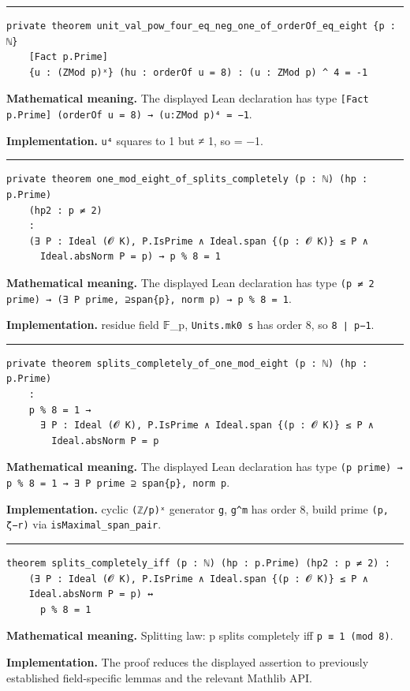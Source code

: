 \documentclass[UTF8,a4paper,11pt,fontset=fandol]{ctexart}
\theoremstyle{definition}
\newcommand{\statementsep}{\par\medskip\hrule\medskip}
\begin{document}
\statementsep
\begin{verbatim}
private theorem unit_val_pow_four_eq_neg_one_of_orderOf_eq_eight {p : ℕ}
    [Fact p.Prime]
    {u : (ZMod p)ˣ} (hu : orderOf u = 8) : (u : ZMod p) ^ 4 = -1
\end{verbatim}
\noindent\textbf{Mathematical meaning.} The displayed Lean declaration has type \texttt{[Fact p.\allowbreak{}Prime] (orderOf u = 8) → (u:ZMod p)⁴ = −1}.\par
\noindent\textbf{Implementation.} \texttt{u⁴} squares to 1 but ≠ 1, so = −1.\par
\statementsep
\begin{verbatim}
private theorem one_mod_eight_of_splits_completely (p : ℕ) (hp : p.Prime)
    (hp2 : p ≠ 2)
    :
    (∃ P : Ideal (𝓞 K), P.IsPrime ∧ Ideal.span {(p : 𝓞 K)} ≤ P ∧
      Ideal.absNorm P = p) → p % 8 = 1
\end{verbatim}
\noindent\textbf{Mathematical meaning.} The displayed Lean declaration has type \texttt{(p ≠ 2 prime) → (∃ P prime, ⊇span\{p\}, norm p) → p \% 8 = 1}.\par
\noindent\textbf{Implementation.} residue field 𝔽\_\allowbreak{}p, \texttt{Units.\allowbreak{}mk0 s} has order 8, so \texttt{8 ∣ p−1}.\par
\statementsep
\begin{verbatim}
private theorem splits_completely_of_one_mod_eight (p : ℕ) (hp : p.Prime)
    :
    p % 8 = 1 →
      ∃ P : Ideal (𝓞 K), P.IsPrime ∧ Ideal.span {(p : 𝓞 K)} ≤ P ∧
        Ideal.absNorm P = p
\end{verbatim}
\noindent\textbf{Mathematical meaning.} The displayed Lean declaration has type \texttt{(p prime) → p \% 8 = 1 → ∃ P prime ⊇ span\{p\}, norm p}.\par
\noindent\textbf{Implementation.} cyclic \texttt{(ℤ/\allowbreak{}p)ˣ} generator \texttt{g}, \texttt{g\textasciicircum{}m} has order 8, build prime \texttt{(p, ζ−r)} via \texttt{isMaximal\_\allowbreak{}span\_\allowbreak{}pair}.\par
\statementsep
\begin{verbatim}
theorem splits_completely_iff (p : ℕ) (hp : p.Prime) (hp2 : p ≠ 2) :
    (∃ P : Ideal (𝓞 K), P.IsPrime ∧ Ideal.span {(p : 𝓞 K)} ≤ P ∧
    Ideal.absNorm P = p) ↔
      p % 8 = 1
\end{verbatim}
\noindent\textbf{Mathematical meaning.} Splitting law: p splits completely iff \texttt{p ≡ 1 (mod 8)}.\par
\noindent\textbf{Implementation.} The proof reduces the displayed assertion to previously established field-specific lemmas and the relevant Mathlib API.\par
\end{document}
